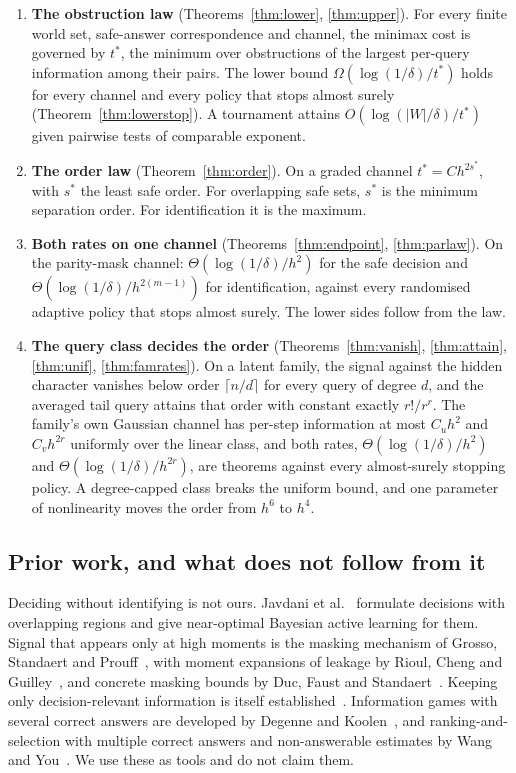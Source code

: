 \begin{enumerate}
\item[1)] \textbf{The obstruction law} (Theorems~\ref{thm:lower}, \ref{thm:upper}). For every
finite world set, safe-answer correspondence and channel, the minimax cost is governed by
$t^{*}$, the minimum over obstructions of the largest per-query information among their pairs.
The lower bound $\Omega(\log(1/\delta)/t^{*})$ holds for every channel and every policy that
stops almost surely (Theorem~\ref{thm:lowerstop}). A
tournament attains $O(\log(|W|/\delta)/t^{*})$ given pairwise tests of comparable exponent.
\item[2)] \textbf{The order law} (Theorem~\ref{thm:order}). On a graded channel $t^{*}=Ch^{2s^{*}}$,
with $s^{*}$ the least safe order. For overlapping safe sets, $s^{*}$ is the minimum
separation order. For identification it is the maximum.
\item[3)] \textbf{Both rates on one channel} (Theorems~\ref{thm:endpoint},
\ref{thm:parlaw}). On the parity-mask channel: $\Theta(\log(1/\delta)/h^{2})$ for the safe
decision and $\Theta(\log(1/\delta)/h^{2(m-1)})$ for identification, against every randomised
adaptive policy that stops almost surely. The lower sides follow from the law.
\item[4)] \textbf{The query class decides the order} (Theorems~\ref{thm:vanish},
\ref{thm:attain}, \ref{thm:unif}, \ref{thm:famrates}). On a latent family, the signal against
the hidden character vanishes below order $\lceil n/d\rceil$ for every query of degree $d$, and
the averaged tail query attains that order with constant exactly $r!/r^{r}$. The family's own
Gaussian channel has per-step information at most $C_{u}h^{2}$ and $C_{v}h^{2r}$ uniformly over
the linear class, and both rates, $\Theta(\log(1/\delta)/h^{2})$ and
$\Theta(\log(1/\delta)/h^{2r})$, are theorems against every almost-surely stopping policy. A
degree-capped class breaks the uniform bound, and one parameter of nonlinearity moves the order
from $h^{6}$ to $h^{4}$.
\end{enumerate}

\subsection{Prior work, and what does not follow from it}

Deciding without identifying is not ours. Javdani et al.~\cite{javdani2014} formulate decisions
with overlapping regions and give near-optimal Bayesian active learning for them. Signal that
appears only at high moments is the masking mechanism of Grosso, Standaert and
Prouff~\cite{grosso2014}, with moment expansions of leakage by Rioul, Cheng and
Guilley~\cite{rioul2021}, and concrete masking bounds by Duc, Faust and Standaert~\cite{duc2015}.
Keeping only decision-relevant information is itself established~\cite{poli2023}. Information
games with several correct answers are developed by Degenne and Koolen~\cite{degenne2019}, and
ranking-and-selection with multiple correct answers and non-answerable estimates by Wang and
You~\cite{wangyou2026}. We use these as tools and do not claim them.

